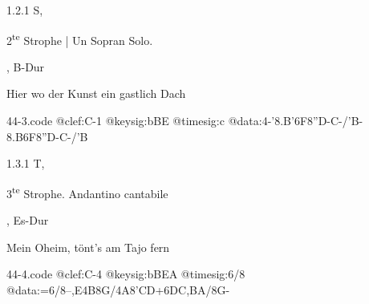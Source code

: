 \documentclass[a4paper, twocolumn, 11pt]{book}
\begin{document}
\newline %
\par 1.2.1  S, \begin{itshape}2\textsuperscript{t}\textsuperscript{e} Strophe | Un Sopran Solo.\end{itshape}, B-Dur\newline \begin{footnotesize} Hier wo der Kunst ein gastlich Dach \end{footnotesize}  
\begin{filecontents*}{44-3.code}
@clef:C-1
@keysig:bBE
@timesig:c
@data:4-'{8.B'6F}8''D-C-/'B-{8.B6F}8''D-C-/'B
\end{filecontents*}

\newline %
\par 1.3.1  T, \begin{itshape}3\textsuperscript{t}\textsuperscript{e} Strophe. Andantino cantabile\end{itshape}, Es-Dur\newline \begin{footnotesize} Mein Oheim, tönt’s am Tajo fern \end{footnotesize}  
\begin{filecontents*}{44-4.code}
@clef:C-4
@keysig:bBEA
@timesig:6/8
@data:=6/8--,E4B8G/4A8'CD+{6DC},{BA}/8G-
\end{filecontents*}
\end{document}
